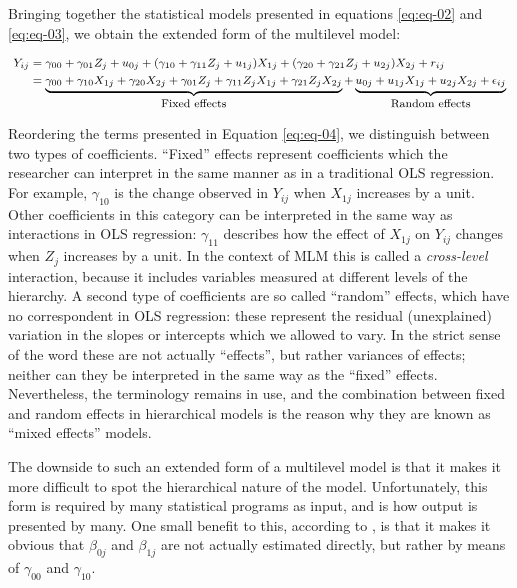 \documentclass[12pt,english]{article}\usepackage[]{graphicx}\usepackage[usenames, dvipsnames]{xcolor}
\begin{document}
Bringing together the statistical models presented in equations \ref{eq:eq-02} and \ref{eq:eq-03}, we obtain the extended form of the multilevel model:

\begin{equation}
\footnotesize
\begin{aligned}
Y_{ij}&=\gamma_{00}+\gamma_{01}Z_{j}+u_{0j}+(\gamma_{10}+\gamma_{11}Z_{j}+u_{1j})X_{1j}+(\gamma_{20}+\gamma_{21}Z_{j}+u_{2j})X_{2j}+r_{ij}\\
      &=\underbrace{\gamma_{00}+\gamma_{10}X_{1j}+\gamma_{20}X_{2j}+\gamma_{01}Z_{j}+\gamma_{11}Z_{j}X_{1j}+\gamma_{21}Z_{j}X_{2j}}_{\mbox{Fixed effects}}+\underbrace{u_{0j}+u_{1j}X_{1j}+u_{2j}X_{2j}+\epsilon_{ij}}_{\mbox{Random effects}}
\end{aligned}
\label{eq:eq-04}
\end{equation}

Reordering the terms presented in Equation \ref{eq:eq-04}, we distinguish between two types of coefficients. ``Fixed'' effects represent coefficients which the researcher can interpret in the same manner as in a traditional OLS regression. For example, $\gamma_{10}$ is the change observed in $Y_{ij}$ when $X_{1j}$ increases by a unit. Other coefficients in this category can be interpreted in the same way as interactions in OLS regression: $\gamma_{11}$ describes how the effect of $X_{1j}$ on $Y_{ij}$ changes when $Z_{j}$ increases by a unit. In the context of MLM this is called a \textit{cross-level} interaction, because it includes variables measured at different levels of the hierarchy. A second type of coefficients are so called ``random'' effects, which have no correspondent in OLS regression: these represent the residual (unexplained) variation in the slopes or intercepts which we allowed to vary. In the strict sense of the word these are not actually ``effects'', but rather variances of effects; neither can they be interpreted in the same way as the ``fixed'' effects. Nevertheless, the terminology remains in use, and the combination between fixed and random effects in hierarchical models is the reason why they are known as ``mixed effects'' models.

The downside to such an extended form of a multilevel model is that it makes it more difficult to spot the hierarchical nature of the model. Unfortunately, this form is required by many statistical programs as input, and is how output is presented by many. One small benefit to this, according to , is that it makes it obvious that $\beta_{0j}$ and $\beta_{1j}$ are not actually estimated directly, but rather by means of $\gamma_{00}$ and $\gamma_{10}$.
\end{document}
